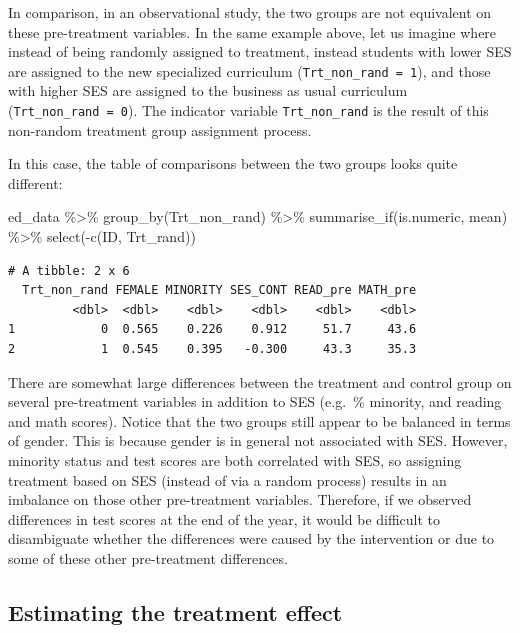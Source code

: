 \documentclass[
  letterpaper,
  DIV=11,
  numbers=noendperiod]{scrreprt}
\newenvironment{Shaded}{\begin{snugshade}}{\end{snugshade}}
\newcommand{\FunctionTok}[1]{\textcolor[rgb]{0.28,0.35,0.67}{#1}}
\newcommand{\NormalTok}[1]{\textcolor[rgb]{0.00,0.23,0.31}{#1}}
\newcommand{\SpecialCharTok}[1]{\textcolor[rgb]{0.37,0.37,0.37}{#1}}
\theoremstyle{definition}
\theoremstyle{remark}
\begin{document}
In comparison, in an observational study, the two groups are not
equivalent on these pre-treatment variables. In the same example above,
let us imagine where instead of being randomly assigned to treatment,
instead students with lower SES are assigned to the new specialized
curriculum (\texttt{Trt\_non\_rand\ =\ 1}), and those with higher SES
are assigned to the business as usual curriculum
(\texttt{Trt\_non\_rand\ =\ 0}). The indicator variable
\texttt{Trt\_non\_rand} is the result of this non-random treatment group
assignment process.

In this case, the table of comparisons between the two groups looks
quite different:

\begin{Shaded}
\begin{Highlighting}[]
\NormalTok{ed\_data }\SpecialCharTok{\%\textgreater{}\%} 
  \FunctionTok{group\_by}\NormalTok{(Trt\_non\_rand) }\SpecialCharTok{\%\textgreater{}\%} 
  \FunctionTok{summarise\_if}\NormalTok{(is.numeric, mean) }\SpecialCharTok{\%\textgreater{}\%} 
  \FunctionTok{select}\NormalTok{(}\SpecialCharTok{{-}}\FunctionTok{c}\NormalTok{(ID, Trt\_rand))}
\end{Highlighting}
\end{Shaded}

\begin{verbatim}
# A tibble: 2 x 6
  Trt_non_rand FEMALE MINORITY SES_CONT READ_pre MATH_pre
         <dbl>  <dbl>    <dbl>    <dbl>    <dbl>    <dbl>
1            0  0.565    0.226    0.912     51.7     43.6
2            1  0.545    0.395   -0.300     43.3     35.3
\end{verbatim}

There are somewhat large differences between the treatment and control
group on several pre-treatment variables in addition to SES (e.g.~\%
minority, and reading and math scores). Notice that the two groups still
appear to be balanced in terms of gender. This is because gender is in
general not associated with SES. However, minority status and test
scores are both correlated with SES, so assigning treatment based on SES
(instead of via a random process) results in an imbalance on those other
pre-treatment variables. Therefore, if we observed differences in test
scores at the end of the year, it would be difficult to disambiguate
whether the differences were caused by the intervention or due to some
of these other pre-treatment differences.

\hypertarget{estimating-the-treatment-effect}{%
\subsection{Estimating the treatment
effect}\label{estimating-the-treatment-effect}}
\end{document}
